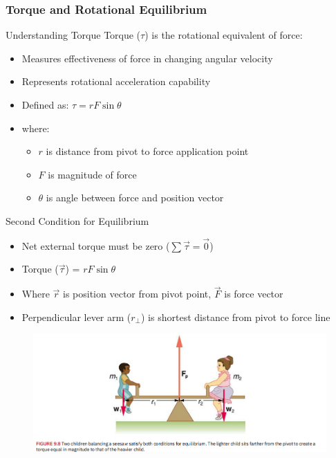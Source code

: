\documentclass{beamer}
\begin{document}
\begin{frame}
\frametitle{Torque and Rotational Equilibrium}

\begin{block}{Understanding Torque}
Torque ($\tau$) is the rotational equivalent of force:
\begin{itemize}
    \item Measures effectiveness of force in changing angular velocity
    \item Represents rotational acceleration capability
    \item Defined as: $\tau = rF\sin\theta$
    \item where:
    \begin{itemize}
        \item $r$ is distance from pivot to force application point
        \item $F$ is magnitude of force
        \item $\theta$ is angle between force and position vector
    \end{itemize}
\end{itemize}
\end{block}
\end{frame}
\begin{frame}
\begin{block}{Second Condition for Equilibrium}
\begin{itemize}
    \item Net external torque must be zero ($\sum \vec{\tau} = \vec{0}$)
    \item Torque ($\vec{\tau}$) = $rF \sin \theta$
    \item Where $\vec{r}$ is position vector from pivot point, $\vec{F}$ is force vector
    \item Perpendicular lever arm ($r_\perp$) is shortest distance from pivot to force line
\end{itemize}
\end{block}

\begin{figure}
    \centering
    \includegraphics[width=1\linewidth]{Screenshot 2024-11-04 120123.png}
\end{figure}
\end{frame}
\end{document}

